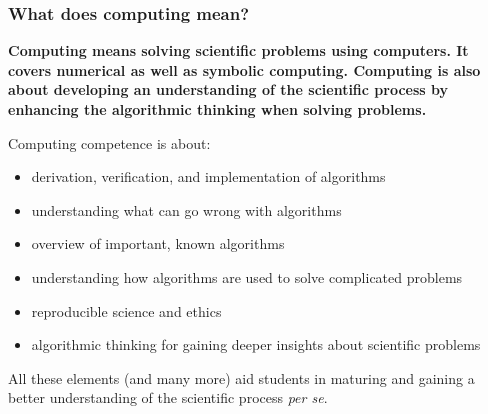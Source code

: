 \documentclass{beamer}
\begin{document}
\begin{frame}
\frametitle{What does computing mean?}

\begin{block}{}

\textbf{Computing means solving scientific problems using computers. It covers numerical as well as symbolic computing. Computing is also about developing an understanding of the scientific process by enhancing the algorithmic thinking when solving problems.}
\end{block}

\begin{block}{Computing competence is about: }

\begin{itemize}
\item derivation, verification, and implementation of algorithms

\item understanding what can go wrong with algorithms

\item overview of important, known algorithms

\item understanding how algorithms are used to solve complicated problems

\item reproducible science and ethics

\item algorithmic thinking for gaining deeper insights about scientific problems
\end{itemize}

\noindent
All these elements (and many more) aid students in maturing and gaining a better understanding of the scientific process \emph{per se}.
\end{block}
\end{frame}
\end{document}
